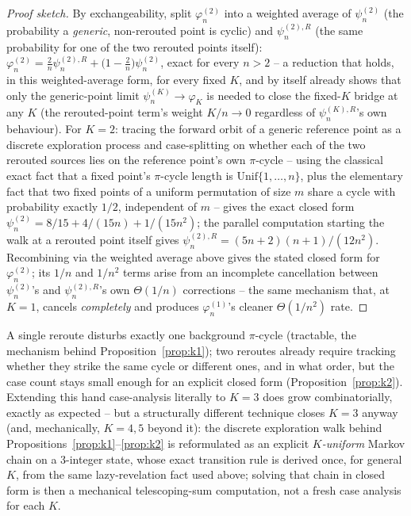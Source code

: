 \documentclass[11pt]{article}
\theoremstyle{remark}
\begin{document}
\begin{proof}[Proof sketch]
By exchangeability, split $\varphi_n^{(2)}$ into a weighted average of
$\psi_n^{(2)}$ (the probability a \emph{generic}, non-rerouted point is
cyclic) and $\psi_n^{(2),R}$ (the same probability for one of the two
rerouted points itself): $\varphi_n^{(2)} =
\tfrac2n\psi_n^{(2),R}+\big(1-\tfrac2n\big)\psi_n^{(2)}$, exact for every
$n>2$ -- a reduction that holds, in this weighted-average form, for every
fixed $K$, and by itself already shows that only the generic-point limit
$\psi_n^{(K)}\to\varphi_K$ is needed to close the fixed-$K$ bridge at any
$K$ (the rerouted-point term's weight $K/n\to0$ regardless of
$\psi_n^{(K),R}$'s own behaviour). For $K=2$: tracing the forward orbit
of a generic reference point as a discrete exploration process and
case-splitting on whether each of the two rerouted sources lies on the
reference point's own $\pi$-cycle -- using the classical exact fact that
a fixed point's $\pi$-cycle length is $\mathrm{Unif}\{1,\dots,n\}$, plus
the elementary fact that two fixed points of a uniform permutation of
size $m$ share a cycle with probability exactly $1/2$, independent of
$m$ -- gives the exact closed form
$\psi_n^{(2)}=8/15+4/(15n)+1/(15n^2)$; the parallel computation starting
the walk at a rerouted point itself gives
$\psi_n^{(2),R}=(5n+2)(n+1)/(12n^2)$. Recombining via the weighted
average above gives the stated closed form for $\varphi_n^{(2)}$; its
$1/n$ and $1/n^2$ terms arise from an incomplete cancellation between
$\psi_n^{(2)}$'s and $\psi_n^{(2),R}$'s own $\Theta(1/n)$ corrections --
the same mechanism that, at $K=1$, cancels \emph{completely} and
produces $\varphi_n^{(1)}$'s cleaner $\Theta(1/n^2)$ rate.
\end{proof}

A single reroute disturbs exactly one background $\pi$-cycle (tractable,
the mechanism behind Proposition~\ref{prop:k1}); two reroutes already
require tracking whether they strike the same cycle or different ones,
and in what order, but the case count stays small enough for an explicit
closed form (Proposition~\ref{prop:k2}). Extending this hand
case-analysis literally to $K=3$ does grow combinatorially, exactly as
expected -- but a structurally different technique closes $K=3$ anyway
(and, mechanically, $K=4,5$ beyond it): the discrete exploration walk
behind Propositions~\ref{prop:k1}--\ref{prop:k2} is reformulated as an
explicit \emph{$K$-uniform} Markov chain on a 3-integer state, whose
exact transition rule is derived once, for general $K$, from the same
lazy-revelation fact used above; solving that chain in closed form is
then a mechanical telescoping-sum computation, not a fresh case analysis
for each $K$.
\end{document}
